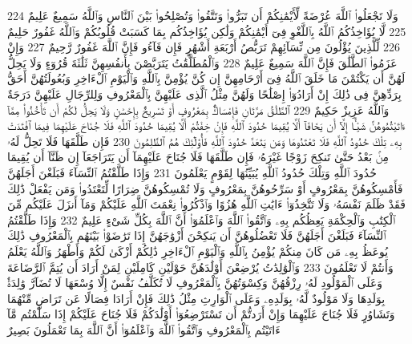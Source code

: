 {\tiny\colorbox{cl_aya}{224}} وَلَا تَجْعَلُوا۟ ٱللَّهَ عُرْضَةً لِّأَيْمَٰنِكُمْ أَن تَبَرُّوا۟ وَتَتَّقُوا۟ وَتُصْلِحُوا۟ بَيْنَ ٱلنَّاسِ وَٱللَّهُ سَمِيعٌ عَلِيمٌ
{\tiny\colorbox{cl_aya}{225}} لَّا يُؤَاخِذُكُمُ ٱللَّهُ بِٱللَّغْوِ فِىٓ أَيْمَٰنِكُمْ وَلَٰكِن يُؤَاخِذُكُم بِمَا كَسَبَتْ قُلُوبُكُمْ وَٱللَّهُ غَفُورٌ حَلِيمٌ
{\tiny\colorbox{cl_aya}{226}} لِّلَّذِينَ يُؤْلُونَ مِن نِّسَآئِهِمْ تَرَبُّصُ أَرْبَعَةِ أَشْهُرٍ فَإِن فَآءُو فَإِنَّ ٱللَّهَ غَفُورٌ رَّحِيمٌ
{\tiny\colorbox{cl_aya}{227}} وَإِنْ عَزَمُوا۟ ٱلطَّلَٰقَ فَإِنَّ ٱللَّهَ سَمِيعٌ عَلِيمٌ
{\tiny\colorbox{cl_aya}{228}} وَٱلْمُطَلَّقَٰتُ يَتَرَبَّصْنَ بِأَنفُسِهِنَّ ثَلَٰثَةَ قُرُوٓءٍ وَلَا يَحِلُّ لَهُنَّ أَن يَكْتُمْنَ مَا خَلَقَ ٱللَّهُ فِىٓ أَرْحَامِهِنَّ إِن كُنَّ يُؤْمِنَّ بِٱللَّهِ وَٱلْيَوْمِ ٱلْءَاخِرِ وَبُعُولَتُهُنَّ أَحَقُّ بِرَدِّهِنَّ فِى ذَٰلِكَ إِنْ أَرَادُوٓا۟ إِصْلَٰحًا وَلَهُنَّ مِثْلُ ٱلَّذِى عَلَيْهِنَّ بِٱلْمَعْرُوفِ وَلِلرِّجَالِ عَلَيْهِنَّ دَرَجَةٌ وَٱللَّهُ عَزِيزٌ حَكِيمٌ
{\tiny\colorbox{cl_aya}{229}} ٱلطَّلَٰقُ مَرَّتَانِ فَإِمْسَاكٌۢ بِمَعْرُوفٍ أَوْ تَسْرِيحٌۢ بِإِحْسَٰنٍ وَلَا يَحِلُّ لَكُمْ أَن تَأْخُذُوا۟ مِمَّآ ءَاتَيْتُمُوهُنَّ شَيْـًٔا إِلَّآ أَن يَخَافَآ أَلَّا يُقِيمَا حُدُودَ ٱللَّهِ فَإِنْ خِفْتُمْ أَلَّا يُقِيمَا حُدُودَ ٱللَّهِ فَلَا جُنَاحَ عَلَيْهِمَا فِيمَا ٱفْتَدَتْ بِهِۦ تِلْكَ حُدُودُ ٱللَّهِ فَلَا تَعْتَدُوهَا وَمَن يَتَعَدَّ حُدُودَ ٱللَّهِ فَأُو۟لَٰٓئِكَ هُمُ ٱلظَّٰلِمُونَ
{\tiny\colorbox{cl_aya}{230}} فَإِن طَلَّقَهَا فَلَا تَحِلُّ لَهُۥ مِنۢ بَعْدُ حَتَّىٰ تَنكِحَ زَوْجًا غَيْرَهُۥ فَإِن طَلَّقَهَا فَلَا جُنَاحَ عَلَيْهِمَآ أَن يَتَرَاجَعَآ إِن ظَنَّآ أَن يُقِيمَا حُدُودَ ٱللَّهِ وَتِلْكَ حُدُودُ ٱللَّهِ يُبَيِّنُهَا لِقَوْمٍ يَعْلَمُونَ
{\tiny\colorbox{cl_aya}{231}} وَإِذَا طَلَّقْتُمُ ٱلنِّسَآءَ فَبَلَغْنَ أَجَلَهُنَّ فَأَمْسِكُوهُنَّ بِمَعْرُوفٍ أَوْ سَرِّحُوهُنَّ بِمَعْرُوفٍ وَلَا تُمْسِكُوهُنَّ ضِرَارًا لِّتَعْتَدُوا۟ وَمَن يَفْعَلْ ذَٰلِكَ فَقَدْ ظَلَمَ نَفْسَهُۥ وَلَا تَتَّخِذُوٓا۟ ءَايَٰتِ ٱللَّهِ هُزُوًا وَٱذْكُرُوا۟ نِعْمَتَ ٱللَّهِ عَلَيْكُمْ وَمَآ أَنزَلَ عَلَيْكُم مِّنَ ٱلْكِتَٰبِ وَٱلْحِكْمَةِ يَعِظُكُم بِهِۦ وَٱتَّقُوا۟ ٱللَّهَ وَٱعْلَمُوٓا۟ أَنَّ ٱللَّهَ بِكُلِّ شَىْءٍ عَلِيمٌ
{\tiny\colorbox{cl_aya}{232}} وَإِذَا طَلَّقْتُمُ ٱلنِّسَآءَ فَبَلَغْنَ أَجَلَهُنَّ فَلَا تَعْضُلُوهُنَّ أَن يَنكِحْنَ أَزْوَٰجَهُنَّ إِذَا تَرَٰضَوْا۟ بَيْنَهُم بِٱلْمَعْرُوفِ ذَٰلِكَ يُوعَظُ بِهِۦ مَن كَانَ مِنكُمْ يُؤْمِنُ بِٱللَّهِ وَٱلْيَوْمِ ٱلْءَاخِرِ ذَٰلِكُمْ أَزْكَىٰ لَكُمْ وَأَطْهَرُ وَٱللَّهُ يَعْلَمُ وَأَنتُمْ لَا تَعْلَمُونَ
{\tiny\colorbox{cl_aya}{233}} وَٱلْوَٰلِدَٰتُ يُرْضِعْنَ أَوْلَٰدَهُنَّ حَوْلَيْنِ كَامِلَيْنِ لِمَنْ أَرَادَ أَن يُتِمَّ ٱلرَّضَاعَةَ وَعَلَى ٱلْمَوْلُودِ لَهُۥ رِزْقُهُنَّ وَكِسْوَتُهُنَّ بِٱلْمَعْرُوفِ لَا تُكَلَّفُ نَفْسٌ إِلَّا وُسْعَهَا لَا تُضَآرَّ وَٰلِدَةٌۢ بِوَلَدِهَا وَلَا مَوْلُودٌ لَّهُۥ بِوَلَدِهِۦ وَعَلَى ٱلْوَارِثِ مِثْلُ ذَٰلِكَ فَإِنْ أَرَادَا فِصَالًا عَن تَرَاضٍ مِّنْهُمَا وَتَشَاوُرٍ فَلَا جُنَاحَ عَلَيْهِمَا وَإِنْ أَرَدتُّمْ أَن تَسْتَرْضِعُوٓا۟ أَوْلَٰدَكُمْ فَلَا جُنَاحَ عَلَيْكُمْ إِذَا سَلَّمْتُم مَّآ ءَاتَيْتُم بِٱلْمَعْرُوفِ وَٱتَّقُوا۟ ٱللَّهَ وَٱعْلَمُوٓا۟ أَنَّ ٱللَّهَ بِمَا تَعْمَلُونَ بَصِيرٌ
